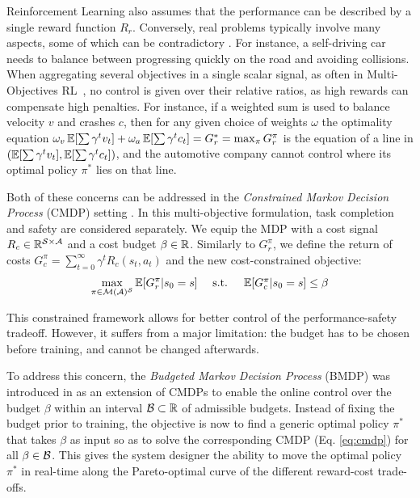 \documentclass{article}
\begin{document}
Reinforcement Learning also assumes that the performance can be described by a single reward function $R_r$. Conversely, real problems typically involve many aspects, some of which can be contradictory \citep{Liu2014}. For instance, a self-driving car needs to balance between progressing quickly on the road and avoiding collisions. When aggregating several objectives in a single scalar signal, as often in Multi-Objectives RL~\citep{Roijers2013ASO}, no control is given over their relative ratios, as high rewards can compensate high penalties. For instance, if a weighted sum is used to balance velocity $v$ and crashes $c$, then for any given choice of weights $\omega$ the optimality equation $\omega_v\operatorname*{\mathbb{E}}[\sum\gamma^t v_t] + \omega_a\operatorname*{\mathbb{E}}[\sum\gamma^t c_t] = G_r^* = \max_\pi G^\pi_r$ is the equation of a line in $(\operatorname*{\mathbb{E}}[\sum\gamma^t v_t], \operatorname*{\mathbb{E}}[\sum\gamma^t c_t])$, and the automotive company cannot control where its optimal policy $\pi^*$ lies on that line.

Both of these concerns can be addressed in the \emph{Constrained Markov Decision Process} (CMDP) setting \citep{BEUTLER1985236,Altman95constrainedmarkov}. In this multi-objective formulation, task completion and safety are considered separately. We equip the MDP with a cost signal $R_c \in \mathbb{R}^{\mathcal{S}\times \mathcal{A}}$ and a cost budget $\beta\in\mathbb{R}$. Similarly to $G_r^\pi$, we define the return of costs $G_c^\pi = \sum_{t=0}^\infty \gamma^t R_c(s_t, a_t)$ and the new cost-constrained objective:
\begin{equation}
\label{eq:cmdp}
\begin{array}{lcr}
 \displaystyle \max_{\pi\in\mathcal{M}(\mathcal{A})^{\mathcal{S}}} \operatorname*{\mathbb{E}}[G_r^\pi | s_0=s] & \text{ s.t. } & \operatorname*{\mathbb{E}}[G_c^\pi | s_0=s] \leq \beta
\end{array}
\end{equation}

This constrained framework allows for better control of the performance-safety tradeoff. However, it suffers from a major limitation: the budget has to be chosen before training, and cannot be changed afterwards.

To address this concern, the \emph{Budgeted Markov Decision Process} (BMDP) was introduced in \citep{Boutilier_Lu:uai16} as an extension of CMDPs to enable the online control over the budget $\beta$ within an interval $\mathcal{B} \subset \mathbb{R}$ of admissible budgets. Instead of fixing the budget prior to training, the objective is now to find a generic optimal policy $\pi^*$ that takes $\beta$ as input so as to solve the corresponding CMDP (Eq. \eqref{eq:cmdp}) for all $\beta\in\mathcal{B}$. This gives the system designer the ability to move the optimal policy $\pi^*$ in real-time along the Pareto-optimal curve of the different reward-cost trade-offs.
\end{document}
